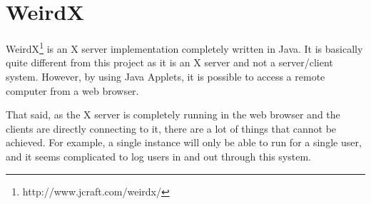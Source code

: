 \section{WeirdX}
%
WeirdX\footnote{http://www.jcraft.com/weirdx/} is an X server implementation completely written in Java.
It is basically quite different from this project as it is an X server and not a 
server/client system. However, by using Java Applets, it is possible to access 
a remote computer from a web browser.

That said, as the X server is completely running in the web browser and the clients 
are directly connecting to it, there are a lot of things that cannot be achieved. 
For example, a single instance will only be able to run for a single user, 
and it seems complicated to log users in and out through this system.
